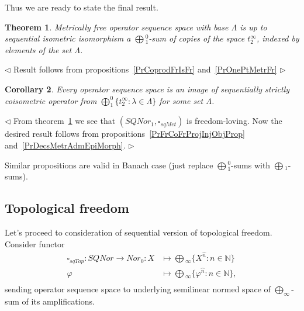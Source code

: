 \documentclass[12pt]{article}
\newtheorem{theorem}{Theorem}[subsection]
\newtheorem{corollary}[theorem]{Corollary}
\newenvironment{proof}{\par $\triangleleft$}{$\triangleright$}
\begin{document}
Thus we are ready to state the final result.

\begin{theorem}\label{ThMetrFrDesc} Metrically free operator sequence space 
with base $\Lambda$ is up to sequential isometric isomorphism 
a $\bigoplus{}_1^0$-sum of copies of the space $t_2^{\infty}$, 
indexed by elements of the set $\Lambda$. 
\end{theorem}
\begin{proof}
Result follows from propositions~\ref{PrCoprodFrIsFr} and~\ref{PrOnePtMetrFr}
\end{proof}

\begin{corollary}\label{CorSQSpaceIsImgMetrAdmEpiMorph}
Every operator sequence space is an image of sequentially strictly 
coisometric operator from $\bigoplus_1^0 \{t_2^\infty:\lambda\in\Lambda \}$ 
for some set $\Lambda$.
\end{corollary}
\begin{proof}
From theorem~\ref{ThMetrFrDesc} we see that $(SQNor_1,\square_{sqMet})$ is 
freedom-loving. Now the desired result follows from 
propositions~\ref{PrFrCoFrProjInjObjProp} and~\ref{PrDecsMetrAdmEpiMorph}.
\end{proof}

Similar propositions are valid in Banach case 
(just replace $\bigoplus{}_1^0$-sums with $\bigoplus{}_1$-sums).








































\subsection{Topological freedom}

Let's proceed to consideration of sequential version of topological freedom. 
Consider functor
$$
\begin{aligned}
\square_{sqTop} : SQNor \to Nor_0: X &\mapsto \bigoplus{}_\infty
 \{X^{\wideparen{n}} : n \in \mathbb{N} \} \\
\varphi&\mapsto\bigoplus{}_\infty \{\varphi^{\wideparen{n}}:n\in\mathbb{N} \},\\
\end{aligned}
$$
sending operator sequence space to underlying semilinear normed 
space of $\bigoplus_\infty$-sum of its amplifications.
\end{document}
